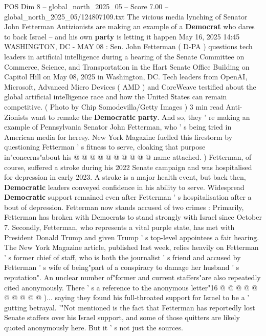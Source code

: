 \begin{textsample}{POS Dim 8 – global\_north\_2025\_05 – Score 7.00 – global\_north\_2025\_05/124807109.txt}  \label{ex:f8_pos_401}
The vicious media lynching of Senator John Fetterman Antizionists are making an example of a \textbf{Democrat} who dares to back Israel -- and his own \textbf{party} is letting it happen May 16, 2025 14:45 WASHINGTON, DC - MAY 08 : Sen.
John Fetterman ( D-PA ) questions tech leaders in artificial intelligence during a hearing of the Senate Committee on Commerce, Science, and Transportation in the Hart Senate Office Building on Capitol Hill on May 08, 2025 in Washington, DC.
Tech leaders from OpenAI, Microsoft, Advanced Micro Devices ( AMD ) and CoreWeave testified about the global artificial intelligence race and how the United States can remain competitive. ( Photo by Chip Somodevilla/Getty Images ) 3 min read Anti-Zionists want to remake the \textbf{Democratic} \textbf{party}.
And so, they ' re making an example of Pennsylvania Senator John Fetterman, who ' s being tried in American media for heresy.
New York Magazine fuelled this firestorm by questioning Fetterman ' s fitness to serve, cloaking that purpose in"concerns"about his @ @ @ @ @ @ @ @ @ @ name attached. ) Fetterman, of course, suffered a stroke during his 2022 Senate campaign and was hospitalised for depression in early 2023.
A stroke is a major health event, but back then, \textbf{Democratic} leaders conveyed confidence in his ability to serve.
Widespread \textbf{Democratic} support remained even after Fetterman ' s hospitalisation after a bout of depression.
Fetterman now stands accused of two crimes : Primarily, Fetterman has broken with Democrats to stand strongly with Israel since October 7.
Secondly, Fetterman, who represents a vital purple state, has met with President Donald Trump and given Trump ' s top-level appointees a fair hearing.
The New York Magazine article, published last week, relies heavily on Fetterman ' s former chief of staff, who is both the journalist ' s friend and accused by Fetterman ' s wife of being"part of a conspiracy to damage her husband ' s reputation".
An unclear number of"former and current staffers"are also repeatedly cited anonymously.
There ' s a reference to the anonymous letter"16 @ @ @ @ @ @ @ @ @ @ )... saying they found his full-throated support for Israel to be a ' gutting betrayal. '"Not mentioned is the fact that Fetterman has reportedly lost Senate staffers over his Israel support, and some of those quitters are likely quoted anonymously here.
But it ' s not just the sources.

\end{textsample}
